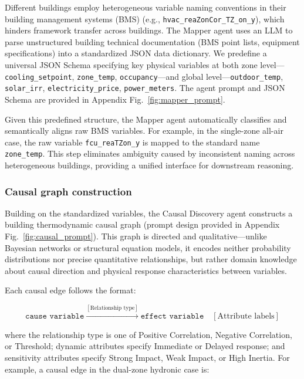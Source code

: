 \documentclass[a4paper]{cas-sc}
\begin{document}
Different buildings employ heterogeneous variable naming conventions in their building management systems (BMS) (e.g., \texttt{hvac\_reaZonCor\_TZ\_on\_y}), which hinders framework transfer across buildings. The Mapper agent uses an LLM to parse unstructured building technical documentation (BMS point lists, equipment specifications) into a standardized JSON data dictionary. We predefine a universal JSON Schema specifying key physical variables at both zone level---\texttt{cooling\_setpoint}, \texttt{zone\_temp}, \texttt{occupancy}---and global level---\texttt{outdoor\_temp}, \texttt{solar\_irr}, \texttt{electricity\_price}, \texttt{power\_meters}. The agent prompt and JSON Schema are provided in Appendix Fig.~\ref{fig:mapper_prompt}.

Given this predefined structure, the Mapper agent automatically classifies and semantically aligns raw BMS variables. For example, in the single-zone all-air case, the raw variable \texttt{fcu\_reaTZon\_y} is mapped to the standard name \texttt{zone\_temp}. This step eliminates ambiguity caused by inconsistent naming across heterogeneous buildings, providing a unified interface for downstream reasoning.

\subsubsection{Causal graph construction}

Building on the standardized variables, the Causal Discovery agent constructs a building thermodynamic causal graph (prompt design provided in Appendix Fig.~\ref{fig:causal_prompt}). This graph is directed and qualitative---unlike Bayesian networks or structural equation models, it encodes neither probability distributions nor precise quantitative relationships, but rather domain knowledge about causal direction and physical response characteristics between variables.

Each causal edge follows the format:

\begin{equation}
\texttt{cause variable} \xrightarrow{[\text{Relationship type}]} \texttt{effect variable} \quad [\text{Attribute labels}]
\label{eq:causal_edge}
\end{equation}

\noindent where the relationship type is one of Positive Correlation, Negative Correlation, or Threshold; dynamic attributes specify Immediate or Delayed response; and sensitivity attributes specify Strong Impact, Weak Impact, or High Inertia. For example, a causal edge in the dual-zone hydronic case is:
\end{document}
